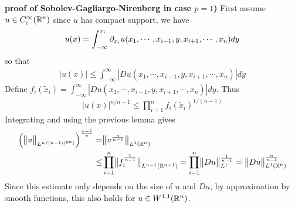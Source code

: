 \documentclass[10pt,a4paper]{report}
\newenvironment{proof}
{\begin{changemargin}{1cm}{0.5cm} 
	}%
	{\end{changemargin}
}
\begin{document}
\begin{proof}
\textbf{proof of Sobolev-Gagliargo-Nirenberg in case $p=1$)} First assume $u\in C_c^{\infty}(\mathbb{R}^n)$ since $u$ has compact support, we have
\begin{align*}
u(x) = \int_{-\infty}^{x_i} \partial_{x_i} u(x_1, \cdots, x_{i-1}, y, x_{i+1}, \cdots, x_n) dy
\end{align*}
so that
\begin{align*}
|u(x)| \leq \int_{-\infty}^{\infty} |Du(x_1, \cdots, x_{i-1},y,x_{i+1},\cdots, x_n)| dy
\end{align*}
Define $f_i(\tilde{x}_i)  = \int_{-\infty}^{\infty} |Du(x_1, \cdots, x_{i-1},y,x_{i+1},\cdots, x_n)| dy$. Thus
\begin{align*}
|u(x)|^{n/n-1} \leq \prod_{i=1}^n f_i(\tilde{x}_i)^{1/(n-1)}
\end{align*}
Integrating and using the previous lemma gives
\begin{align*}
\Big( \bigl\lVert u\bigr\rVert_{L^{n/(n-1)(\mathbb{R}^n)}}  \Big)^{\frac{n-1}{n}} =& \bigl\lVert u^{\frac{n}{n-1}}\bigr\rVert_{L^1(\mathbb{R}^n)}  \\
\leq& \prod_{i=1}^n \bigl\lVert f_i^{\frac{1}{n-1}}\bigr\rVert_{L^{n-1}(\mathbb{R}^{n-1})} = \prod_{i=1}^n \bigl\lVert Du\bigr\rVert_{L^1}^{\frac{1}{n-1}} = \bigl\lVert Du\bigr\rVert_{L^1(\mathbb{R}^n)}^{\frac{n}{n-1}}
\end{align*}
Since this estimate only depends on the size of $u$ and $Du$, by approximation by smooth functions, this also holds for $u\in W^{1,1}(\mathbb{R}^n)$.

\eop
\end{proof}
\end{document}
